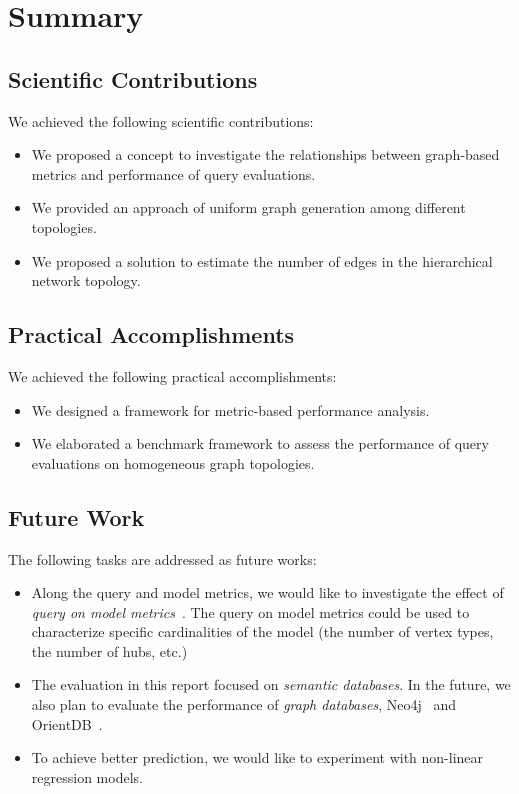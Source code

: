 \chapter{Summary}

\section{Scientific Contributions}

We achieved the following scientific contributions:

\begin{itemize}
	\item We proposed a concept to investigate the relationships between graph-based metrics and performance of query evaluations.
	\item We provided an approach of uniform graph generation among different topologies.
	\item We proposed a solution to estimate the number of edges in the hierarchical network topology.
\end{itemize}

\section{Practical Accomplishments}

We achieved the following practical accomplishments:

\begin{itemize}
	\item We designed a framework for metric-based performance analysis.
	\item We elaborated a benchmark framework to assess the performance of query evaluations on homogeneous graph topologies.
\end{itemize}

\section{Future Work}

The following tasks are addressed as future works:

\begin{itemize}
	\item Along the query and model metrics, we would like to investigate the effect of \emph{query on model metrics}~\cite{metric_ase}. The query on model metrics could be used to characterize specific cardinalities of the model (\eg the number of vertex types, the number of hubs, etc.)
	\item The evaluation in this report focused on \emph{semantic databases}. In the future, we also plan to evaluate the performance of \emph{graph databases}, \eg Neo4j~\cite{Neo4j} and OrientDB~\cite{OrientDB}.
	\item To achieve better prediction, we would like to experiment with non-linear regression models. 
\end{itemize}

